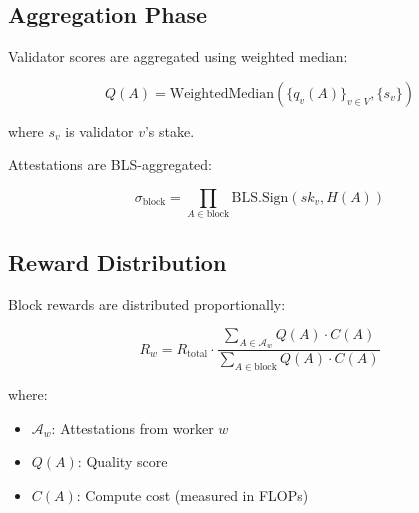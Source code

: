 \subsection{Aggregation Phase}

Validator scores are aggregated using weighted median:

\begin{equation}
Q(A) = \text{WeightedMedian}(\{q_v(A)\}_{v \in V}, \{s_v\})
\end{equation}

where $s_v$ is validator $v$'s stake.

Attestations are BLS-aggregated:

\begin{equation}
\sigma_{\text{block}} = \prod_{A \in \text{block}} \text{BLS.Sign}(sk_v, H(A))
\end{equation}

\subsection{Reward Distribution}

Block rewards are distributed proportionally:

\begin{equation}
R_w = R_{\text{total}} \cdot \frac{\sum_{A \in \mathcal{A}_w} Q(A) \cdot C(A)}{\sum_{A \in \text{block}} Q(A) \cdot C(A)}
\end{equation}

where:
\begin{itemize}
    \item $\mathcal{A}_w$: Attestations from worker $w$
    \item $Q(A)$: Quality score
    \item $C(A)$: Compute cost (measured in FLOPs)
\end{itemize}

